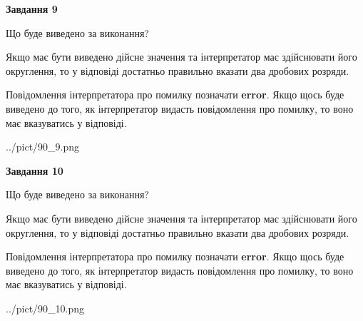 \documentclass[12pt, ukrainian]{article}
\begin{document}
{\begin {Large}
{\begin {center}\textbf{Завдання 9}\end {center}}\par
Що буде виведено за виконання? \par

Якщо має бути виведено дійсне значення та інтерпретатор має здійснювати його округлення, 
то у відповіді достатньо правильно вказати два дробових розряди.

Повідомлення інтерпретатора про помилку позначати \textbf{error}.
Якщо щось буде виведено до того, як інтерпретатор видасть повідомлення про помилку, 
то воно має вказуватись у відповіді. \par

\begin{center}
	{../pict/90_9.png}
\end{center}
\newpage

{\begin {center}\textbf{Завдання 10}\end {center}}\par
Що буде виведено за виконання? \par

Якщо має бути виведено дійсне значення та інтерпретатор має здійснювати його округлення, 
то у відповіді достатньо правильно вказати два дробових розряди.

Повідомлення інтерпретатора про помилку позначати \textbf{error}.
Якщо щось буде виведено до того, як інтерпретатор видасть повідомлення про помилку, 
то воно має вказуватись у відповіді. \par

\begin{center}
	{../pict/90_10.png}
\end{center}
\newpage

\end {Large}}
\end{document}
